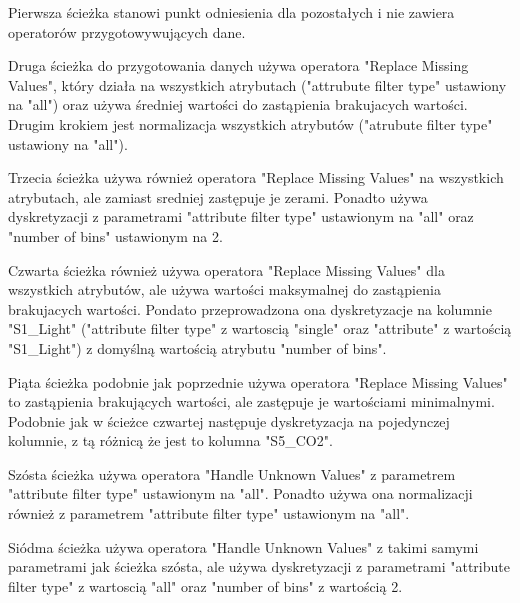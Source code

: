 \documentclass[12pt,oneside,a4paper]{book} %
\theoremstyle{break}
\begin{document}
Pierwsza ścieżka stanowi punkt odniesienia dla pozostałych i nie zawiera operatorów przygotowywujących dane.

Druga ścieżka do przygotowania danych używa operatora "Replace Missing Values", który działa na wszystkich atrybutach ("attrubute filter type" ustawiony na "all") oraz używa średniej wartości do zastąpienia brakujacych wartości. Drugim krokiem jest normalizacja wszystkich atrybutów ("atrubute filter type" ustawiony na "all").

Trzecia ścieżka używa również operatora "Replace Missing Values" na wszystkich atrybutach, ale zamiast sredniej zastępuje je zerami. Ponadto używa dyskretyzacji z parametrami "attribute filter type" ustawionym na "all" oraz "number of bins" ustawionym na 2.

Czwarta ścieżka również używa operatora "Replace Missing Values" dla wszystkich atrybutów, ale używa wartości maksymalnej do zastąpienia brakujacych wartości.
Pondato przeprowadzona ona dyskretyzacje na kolumnie "S1\_Light" ("attribute filter type" z wartoscią "single" oraz "attribute" z wartością "S1\_Light") z domyślną wartością atrybutu "number of bins".

Piąta ścieżka podobnie jak poprzednie używa operatora "Replace Missing Values" to zastąpienia brakujących wartości, ale zastępuje je wartościami minimalnymi. Podobnie jak w ścieżce czwartej następuje dyskretyzacja na pojedynczej kolumnie, z tą różnicą że jest to kolumna "S5\_CO2".

Szósta ścieżka używa operatora "Handle Unknown Values" z parametrem "attribute filter type" ustawionym na "all". Ponadto używa ona normalizacji również z parametrem "attribute filter type" ustawionym na "all".

Siódma ścieżka używa operatora "Handle Unknown Values" z takimi samymi parametrami jak ścieżka szósta, ale używa dyskretyzacji z parametrami "attribute filter type" z wartoscią "all" oraz "number of bins" z wartością 2.
\end{document}
